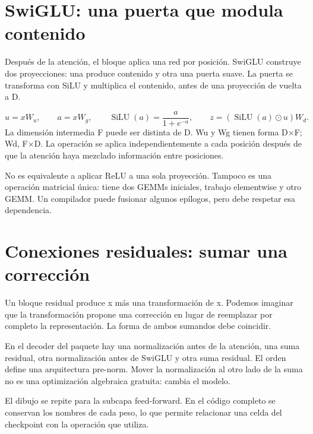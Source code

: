 \documentclass[12pt,a4paper,oneside]{report}
\begin{document}
\section{SwiGLU: una puerta que modula contenido}
Después de la atención, el bloque aplica una red por posición. SwiGLU construye dos proyecciones: una produce contenido y otra una puerta suave. La puerta se transforma con SiLU y multiplica el contenido, antes de una proyección de vuelta a D. \cite{swiglu}

\[
u=xW_u,\qquad a=xW_g,\qquad
\operatorname{SiLU}(a)=\frac{a}{1+e^{-a}},\qquad
z=(\operatorname{SiLU}(a)\odot u)W_d.
\]
La dimensión intermedia F puede ser distinta de D. Wu y Wg tienen forma D\ensuremath{\times}F; Wd, F\ensuremath{\times}D. La operación se aplica independientemente a cada posición después de que la atención haya mezclado información entre posiciones.

No es equivalente a aplicar ReLU a una sola proyección. Tampoco es una operación matricial única: tiene dos GEMMs iniciales, trabajo elementwise y otro GEMM. Un compilador puede fusionar algunos epílogos, pero debe respetar esa dependencia.

\section{Conexiones residuales: sumar una corrección}
Un bloque residual produce x más una transformación de x. Podemos imaginar que la transformación propone una corrección en lugar de reemplazar por completo la representación. La forma de ambos sumandos debe coincidir.

En el decoder del paquete hay una normalización antes de la atención, una suma residual, otra normalización antes de SwiGLU y otra suma residual. El orden define una arquitectura pre-norm. Mover la normalización al otro lado de la suma no es una optimización algebraica gratuita: cambia el modelo.

\begin{center}
\end{center}
El dibujo se repite para la subcapa feed-forward. En el código completo se conservan los nombres de cada peso, lo que permite relacionar una celda del checkpoint con la operación que utiliza.
\end{document}
